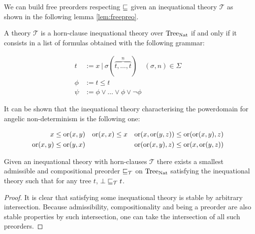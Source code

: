 We can build free preorders respecting $\sqsubseteq$
given an inequational theory $\mathcal{T}$ as shown
in the following lemma \ref{lem:freepreo}.

\begin{adefinition}
    A theory $\mathcal{T}$ is a horn-clause inequational 
    theory over $\textnormal{Tree}_{\textnormal{Nat}}$ if and only if it consists 
    in a list of formulas obtained with the following grammar:

    \begin{align*}
        t    &:= x ~|~ \sigma (\overbrace{t,\dots,t}^n) \quad (\sigma,n) \in
        \Sigma\\
        \phi &:= t \leq t \\
        \psi &:= \phi \vee \dots \vee \phi \vee \neg \phi
    \end{align*}
\end{adefinition}

\begin{example}
    It can be shown that the inequational theory 
    characterising the powerdomain for angelic 
    non-determinism is the following one:

    \begin{align*}
        x \leq \operatorname{or} (x,y) & & \operatorname{or} (x,x) \leq x & & \operatorname{or} (x,\operatorname{or} (y,z))
        \leq \operatorname{or}(\operatorname{or} (x,y),z) \\
        \operatorname{or} (x,y) \leq \operatorname{or}(y,x) & & & & \operatorname{or}(\operatorname{or} (x,y),z) \leq \operatorname{or}
        (x,\operatorname{or} (y,z))
    \end{align*}
\end{example}

\begin{alemma}
    \label{lem:freepreo}
    Given an inequational theory with horn-clauses $\mathcal{T}$
    there exists a smallest admissible 
    and compositional preorder $\sqsubseteq_\mathcal{T}$ 
    on $\textnormal{Tree}_{\textnormal{Nat}}$ satisfying the inequational theory 
    such that for any tree $t$, $\bot \sqsubseteq_\mathcal{T} t$.
\end{alemma}

\begin{proof}
    It is clear that satisfying some inequational 
    theory is stable by arbitrary intersection. Because 
    admissibility, compositionality and being 
    a preorder are also 
    stable properties by such intersection, one 
    can take the intersection of all such preorders.
\end{proof}
